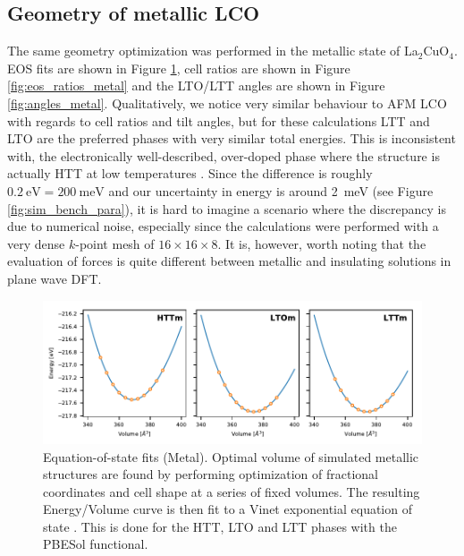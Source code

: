 \subsection{Geometry of metallic LCO}
The same geometry optimization was performed in the metallic state of La$_2$CuO$_4$. EOS fits are shown in Figure \ref{fig:eos_metal_all}, cell ratios are shown in Figure \ref{fig:eos_ratios_metal} and the LTO/LTT angles are shown in Figure \ref{fig:angles_metal}. Qualitatively, we notice very similar behaviour to AFM LCO with regards to cell ratios and tilt angles, but for these calculations LTT and LTO are the preferred phases with very similar total energies. This is inconsistent with, the electronically well-described, over-doped phase where the structure is actually HTT at low temperatures \cite{Radaelli1994a}. Since the difference is roughly $\SI{0.2}{\eV} = \SI{200}{\milli\eV}$ and our uncertainty in energy is around \SI{2}{\milli\eV} (see Figure \ref{fig:sim_bench_para}), it is hard to imagine a scenario where the discrepancy is due to numerical noise, especially since the calculations were performed with a very dense $k$-point mesh of $16 \times 16 \times 8$. It is, however, worth noting that the evaluation of forces is quite different between metallic and insulating solutions in plane wave DFT.

\begin{figure}
    \centering
    \includegraphics[width=\textwidth]{fig/simulation/eos_metal_all.pdf}
    \caption[Metal: Equation-of-state fits]{Equation-of-state fits (Metal). Optimal volume of simulated metallic structures are found by performing optimization of fractional coordinates and cell shape at a series of fixed volumes. The resulting Energy/Volume curve is then fit to a Vinet exponential equation of state \cite{Vinet1987}. This is done for the HTT, LTO and LTT phases with the PBESol functional.}
    \label{fig:eos_metal_all}
\end{figure}


